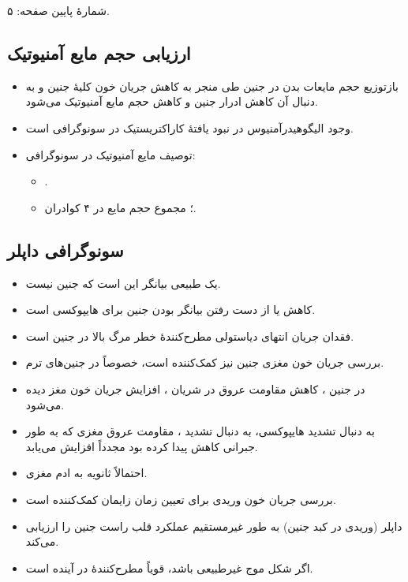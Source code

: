 \documentclass[12pt,a4paper]{article}
\begin{document}
\FGheader\par
شمارهٔ پایین صفحه: ۵.

\subsection*{ارزیابی حجم مایع آمنیوتیک}
\begin{itemize}
\item بازتوزیع حجم مایعات بدن در جنین طی  منجر به کاهش جریان خون کلیهٔ جنین و به دنبال آن کاهش ادرار جنین و کاهش حجم مایع آمنیوتیک می‌شود.
\item وجود الیگوهیدرآمنیوس در نبود  یافتهٔ کاراکتریستیک  در سونوگرافی است.
\item توصیف مایع آمنیوتیک در سونوگرافی:
  \begin{itemize}
  \item {}.
  \item {}؛ مجموع حجم مایع در ۴ کوادران.
  \end{itemize}
\end{itemize}

\subsection*{سونوگرافی داپلر}
\begin{itemize}
\item یک  طبیعی بیانگر این است که جنین  نیست.
\item کاهش یا از دست رفتن  بیانگر  بودن جنین برای هایپوکسی است.
\item فقدان جریان انتهای دیاستولی  مطرح‌کنندهٔ خطر مرگ بالا در جنین  است.
\item بررسی جریان خون مغزی جنین نیز کمک‌کننده است، خصوصاً در جنین‌های ترم.
\item در جنین ، کاهش مقاومت عروق در شریان ، افزایش جریان خون مغز دیده می‌شود.
\item به دنبال تشدید هایپوکسی، به دنبال تشدید ، مقاومت عروق مغزی که به طور جبرانی کاهش پیدا کرده بود مجدداً افزایش می‌یابد.
\item احتمالاً ثانویه به ادم مغزی.
\item بررسی جریان خون وریدی برای تعیین زمان زایمان کمک‌کننده است.
\item داپلر  (وریدی در کبد جنین) به طور غیرمستقیم عملکرد قلب راست جنین را ارزیابی می‌کند.
\item اگر شکل موج  غیرطبیعی باشد، قویاً مطرح‌کنندهٔ  در آینده است.
\end{itemize}
\end{document}
